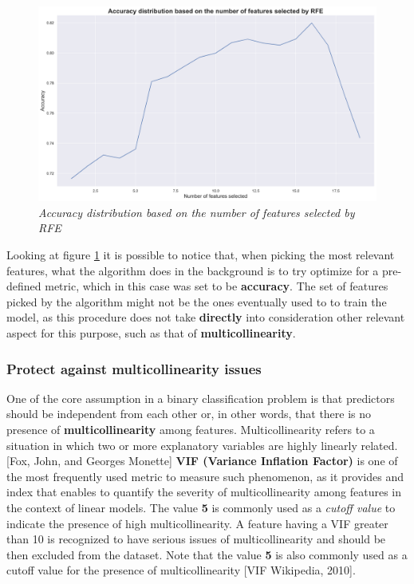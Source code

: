 \documentclass[a4paper,12pt]{article}
\begin{document}
            \begin{figure}[H]
                \centerline{
                    \includegraphics[width=\linewidth]{./images/model_features_RFE.png}
                }
                \caption{\textit{Accuracy distribution based on the number of features selected by RFE}}
                \label{fig:RFE}
            \end{figure}


        Looking at figure \ref{fig:RFE} it is possible to notice that, when picking the most relevant features, what the algorithm does 
        in the background is to try optimize for a pre-defined metric, which in this case was set to be \textbf{accuracy}.
        The set of features picked by the algorithm  might not be the ones eventually used to to train the model,
        as this procedure does not take \textbf{directly} into consideration other relevant aspect for this purpose, such as that of \textbf{multicollinearity}.

        \subsubsection{Protect against multicollinearity issues}
        One of the core assumption in a binary classification problem is that predictors should be independent from each other or,
        in other words, that there is no presence of \textbf{multicollinearity} among features. 
        Multicollinearity refers to a situation in which two or more explanatory variables are highly linearly related. [Fox, John, and Georges Monette] 
        \textbf{VIF (Variance Inflation Factor)} is one of the most frequently used metric to measure such phenomenon, as it 
        provides and index that enables to quantify the severity of multicollinearity among features in the context of linear models.
        The value \textbf{5} is commonly used as a \textit{cutoff value} to indicate the presence of high multicollinearity. 
        A feature having a VIF greater than 10 is recognized to have serious issues of multicollinearity and 
        should be then excluded from the dataset. Note that the value \textbf{5} is also commonly used as a cutoff value for 
        the presence of multicollinearity [VIF Wikipedia, 2010]. 
\end{document}
